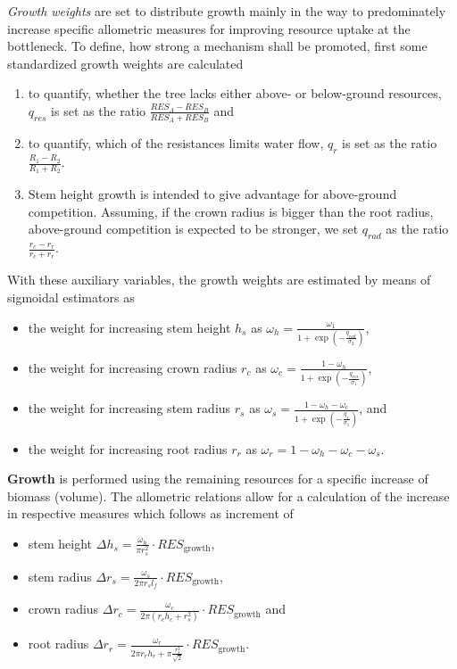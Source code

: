 \documentclass[manusscript, 12p, authoryear]{elsarticle}
\begin{document}
\textit{Growth weights}
are set to distribute growth mainly in the way to predominately increase specific allometric measures for improving resource uptake at the bottleneck.
To define, how strong a mechanism shall be promoted, first some standardized growth weights are calculated
\begin{enumerate}
\item to quantify, whether the tree lacks either above- or below-ground resources,
$q_{res}$ is set as the ratio
$\frac{RES_A - RES_B}{RES_A + RES_B}$ and 
\item to quantify, which of the resistances limits water flow, $q_r$ is set as the ratio $\frac{R_1 - R_2}{R_1 + R_2}$.
\item Stem height growth is intended to give advantage for above-ground competition.
Assuming, if the crown radius is bigger than the root radius, above-ground competition is expected to be stronger, we set $q_{rad}$ as the ratio $\frac{r_c - r_r}{r_c + r_r}$.
\end{enumerate}
With these auxiliary variables, the growth weights are estimated by means of sigmoidal estimators as
\begin{itemize}
\item the weight for increasing stem height $h_s$ as 
$\omega_h = \frac{\omega_1}{1 + \exp\left(-\frac{q_{rad}}{\sigma_2}\right)}$,
\item the weight for increasing crown radius $r_c$ as 
$\omega_c = \frac{1 - \omega_h}{1 + \exp\left(-\frac{q_{res}}{\sigma_1}\right)}$,
\item the weight for increasing stem radius $r_s$ as 
$\omega_s = \frac{1 - \omega_h-\omega_c}{1 + \exp\left(-\frac{q_r}{\sigma_1}\right)}$, and
\item the weight for increasing root radius $r_r$ as 
$\omega_r = 1 - \omega_h-\omega_c - \omega_s$.
\end{itemize}
\textbf{Growth} is performed using the remaining resources for a specific increase of biomass (volume).
The allometric relations allow for a calculation of the increase in respective measures which follows as increment of
\begin{itemize}
\item stem height $\Delta h_s = \frac{\omega_h }{\pi r_s^2}\cdot RES_{\text{growth}}$,
\item stem radius $\Delta r_s = \frac{\omega_s}{2\pi r_s l_f}\cdot RES_{\text{growth}}$,
\item crown radius $\Delta r_c = \frac{\omega_c }{2\pi \left(r_c h_c + r_s^2\right)}\cdot RES_{\text{growth}}$ and
\item root radius $\Delta r_r = \frac{\omega_r}{2 \pi r_r h_r + \pi \frac{r_s^2}{\sqrt{2}}}\cdot RES_{\text{growth}}$.
\end{itemize}
\end{document}
